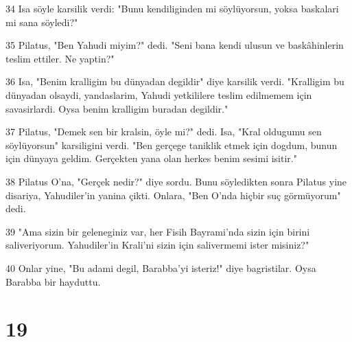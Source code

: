 \par 34 Isa söyle karsilik verdi: "Bunu kendiliginden mi söylüyorsun, yoksa baskalari mi sana söyledi?"
\par 35 Pilatus, "Ben Yahudi miyim?" dedi. "Seni bana kendi ulusun ve baskâhinlerin teslim ettiler. Ne yaptin?"
\par 36 Isa, "Benim kralligim bu dünyadan degildir" diye karsilik verdi. "Kralligim bu dünyadan olsaydi, yandaslarim, Yahudi yetkililere teslim edilmemem için savasirlardi. Oysa benim kralligim buradan degildir."
\par 37 Pilatus, "Demek sen bir kralsin, öyle mi?" dedi. Isa, "Kral oldugumu sen söylüyorsun" karsiligini verdi. "Ben gerçege taniklik etmek için dogdum, bunun için dünyaya geldim. Gerçekten yana olan herkes benim sesimi isitir."
\par 38 Pilatus O'na, "Gerçek nedir?" diye sordu. Bunu söyledikten sonra Pilatus yine disariya, Yahudiler'in yanina çikti. Onlara, "Ben O'nda hiçbir suç görmüyorum" dedi.
\par 39 "Ama sizin bir geleneginiz var, her Fisih Bayrami'nda sizin için birini saliveriyorum. Yahudiler'in Krali'ni sizin için salivermemi ister misiniz?"
\par 40 Onlar yine, "Bu adami degil, Barabba'yi isteriz!" diye bagristilar. Oysa Barabba bir hayduttu.

\chapter{19}

